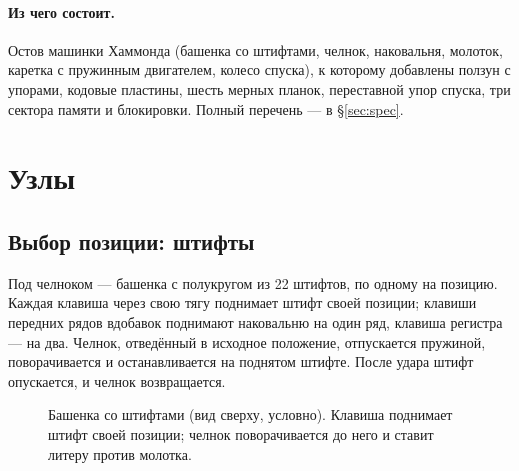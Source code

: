 \paragraph{Из чего состоит.} Остов машинки Хаммонда (башенка со штифтами, челнок, наковальня, молоток, каретка с пружинным двигателем, колесо спуска), к которому добавлены ползун с упорами, кодовые пластины, шесть мерных планок, переставной упор спуска, три сектора памяти и блокировки. Полный перечень — в \S\ref{sec:spec}.

\section{Узлы}

\subsection{Выбор позиции: штифты}

Под челноком — башенка с полукругом из 22 штифтов, по одному на позицию. Каждая клавиша через свою тягу поднимает штифт своей позиции; клавиши передних рядов вдобавок поднимают наковальню на один ряд, клавиша регистра — на два. Челнок, отведённый в исходное положение, отпускается пружиной, поворачивается и останавливается на поднятом штифте. После удара штифт опускается, и челнок возвращается.

\begin{figure}[h]
\centering
{}
\caption{Башенка со штифтами (вид сверху, условно). Клавиша поднимает штифт своей позиции; челнок поворачивается до него и ставит литеру против молотка.}
\label{fig:pins}
\end{figure}

